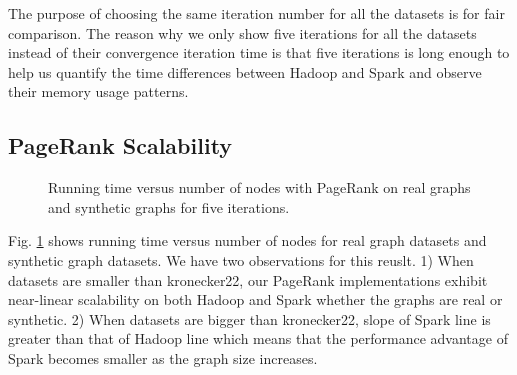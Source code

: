 \documentclass[12pt,conference,letterpaper]{IEEEtran}
\begin{document}
The purpose of choosing the same iteration number for all the datasets is for fair comparison. The reason why we only show five iterations for all the datasets instead of their convergence iteration time is that five iterations is long enough to help us quantify the time differences between Hadoop and Spark and observe their memory usage patterns.



\subsection{PageRank Scalability}

\begin{figure}[!t]
    \centering
    \caption{Running time versus number of nodes with PageRank on real graphs and synthetic graphs for five iterations.}
    \label{fig:time_vs_size}
\end{figure}

Fig. \ref{fig:time_vs_size} shows running time versus number of nodes for real graph datasets and synthetic graph datasets. We have two observations for this reuslt. 1) When datasets are smaller than kronecker22, our PageRank implementations exhibit near-linear scalability on both Hadoop and Spark whether the graphs are real or synthetic. 2) When datasets are bigger than kronecker22, slope of Spark line is greater than that of Hadoop line which means that the performance advantage of Spark becomes smaller as the graph size increases.
\end{document}
